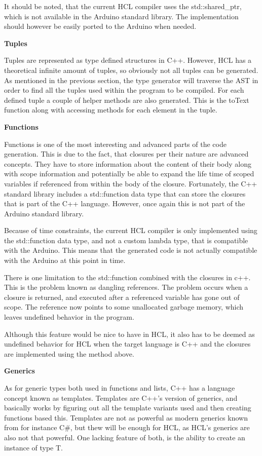 It should be noted, that the current HCL compiler uses the std::shared\_ptr, which is not available in the Arduino standard library.
The implementation should however be easily ported to the Arduino when needed.

\textbf{Tuples}

Tuples are represented as type defined structures in C++.
However, HCL has a theoretical infinite amount of tuples, so obviously not all tuples can be generated.
As mentioned in the previous section, the type generator will traverse the AST in order to find all the tuples used within the program to be compiled.
For each defined tuple a couple of helper methods are also generated.
This is the toText function along with accessing methods for each element in the tuple.

\textbf{Functions}

Functions is one of the most interesting and advanced parts of the code generation.
This is due to the fact, that closures per their nature are advanced concepts.
They have to store information about the content of their body along with scope information and potentially be able to expand the life time of scoped variables if referenced from within the body of the closure.
Fortunately, the C++ standard library includes a std::function data type that can store the closures that is part of the C++ language.
However, once again this is not part of the Arduino standard library.

Because of time constraints, the current HCL compiler is only implemented using the std::function data type, and not a custom lambda type, that is compatible with the Arduino.
This means that the generated code is not actually compatible with the Arduino at this point in time.

There is one limitation to the std::function combined with the closures in c++.
This is the problem known as dangling references.
The problem occurs when a closure is returned, and executed after a referenced variable has gone out of scope.
The reference now points to some unallocated garbage memory, which leaves undefined behavior in the program.

Although this feature would be nice to have in HCL, it also has to be deemed as undefined behavior for HCL when the target language is C++ and the closures are implemented using the method above.

\textbf{Generics}

As for generic types both used in functions and lists, C++ has a language concept known as templates.
Templates are C++'s version of generics, and basically works by figuring out all the template variants used and then creating functions based this.
Templates are not as powerful as modern generics known from for instance C\#, but thew will be enough for HCL, as HCL's generics are also not that powerful.
One lacking feature of both, is the ability to create an instance of type T.

